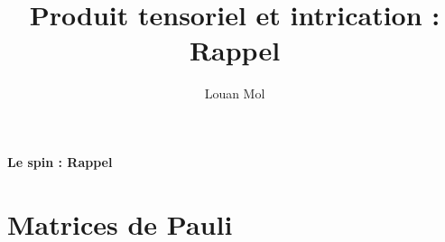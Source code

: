 \documentclass[11pt,a4paper,oneside]{article}
\title{Produit tensoriel et intrication : Rappel}
\author{Louan Mol}
\begin{document}
\begin{center}
    {\huge \textbf{Le spin : Rappel}}
\end{center}

\section{Matrices de Pauli}
\end{document}
